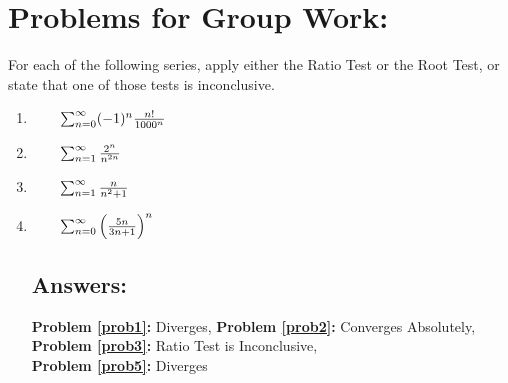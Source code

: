 \documentclass[10pt]{article}
\begin{document}
\pagebreak

\section*{Problems for Group Work:}

For each of the following series, apply either the Ratio Test or the Root Test, or state that one of those tests is inconclusive.


\begin{enumerate}

\item \(\qquad\sum_{n=0}^\infty (-1)^{n}\frac{n!}{1000^n}\) \label{prob1}

\vfill

\item \(\qquad\sum_{n=1}^\infty \frac{2^n}{n^{2n}} \) \label{prob2}

\vfill

\item \(\qquad\sum_{n=1}^\infty \frac{n}{n^2+1}\) \label{prob3}

\vfill

%
%

\item \(\qquad\sum_{n=0}^\infty \left(\frac{5n}{3n+1}\right)^n\) \label{prob5}


\vfill



\subsection*{Answers:}
\textbf{Problem \ref{prob1}:} Diverges, 
\textbf{Problem \ref{prob2}:} Converges Absolutely, 
\textbf{Problem \ref{prob3}:} Ratio Test is Inconclusive, 
\\\textbf{Problem \ref{prob5}:} Diverges




\end{enumerate}
\end{document}

